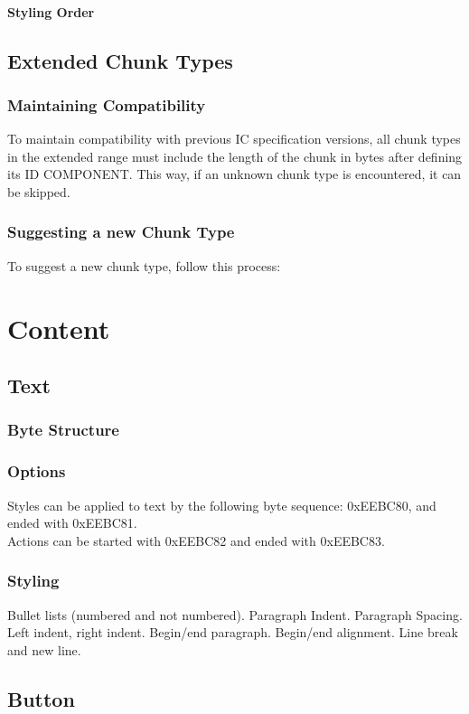 \documentclass{report}
\begin{document}
\subsubsection{Styling Order}

\section{Extended Chunk Types}
\subsection{Maintaining Compatibility}
To maintain compatibility with previous IC specification versions, all chunk types in the extended range must include the length of the chunk in bytes after defining its ID COMPONENT. This way, if an unknown chunk type is encountered, it can be skipped.
\subsection{Suggesting a new Chunk Type}
To suggest a new chunk type, follow this process:

\chapter{Content}
\section{Text}
\subsection{Byte Structure}
\subsection{Options}
Styles can be applied to text by the following byte sequence: 0xEEBC80, and ended with 0xEEBC81.\\
Actions can be started with 0xEEBC82 and ended with 0xEEBC83.
\subsection{Styling}
Bullet lists (numbered and not numbered). Paragraph Indent. Paragraph Spacing. Left indent, right indent. Begin/end paragraph. Begin/end alignment. Line break and new line.
\section{Button}
\end{document}
